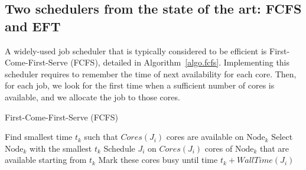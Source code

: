 \documentclass[conference,10pt]{IEEEtran}
\newcommand{\Node}[1]{\ensuremath{\mathrm{Node}_{#1}}\xspace}
\newcommand{\core}{\mathit{Cores}\xspace}
\newcommand{\walltime}{\mathit{WallTime}\xspace}
\newcommand{\nodeset}{\ensuremath{\mathbb{N}}\xspace}
\begin{document}





\subsection{Two schedulers from the state of the art: FCFS and EFT}\label{subsec.fcfs_eft}

A widely-used job scheduler that is typically considered to be efficient is
First-Come-First-Serve (FCFS), detailed in
Algorithm~\ref{algo.fcfs}. Implementing this scheduler requires to
remember the time of next availability for each core. Then, for each job, we look
for the first time when a sufficient number of cores is available, and we allocate the job to
those cores.


\begin{algorithm}[htbp]%
\caption{First-Come-First-Serve (FCFS)}\label{algo.fcfs}
\begin{algorithmic}[1]
        \ForEach{$\Node{k} \in \nodeset$}
        \State Find smallest time $t_k$ such that $\core(J_i)$ cores are available on \Node{k}\label{fcfs.ln.find}
        \EndFor
        \State Select \Node{k}  with the smallest $t_k$
        \State Schedule $J_i$ on $\core(J_i)$ cores of \Node{k} that are available starting from $t_k$
        \State Mark these cores busy until time $t_k +\walltime(J_i)$
	\EndFor
	\end{algorithmic}
\end{algorithm}
\end{document}
